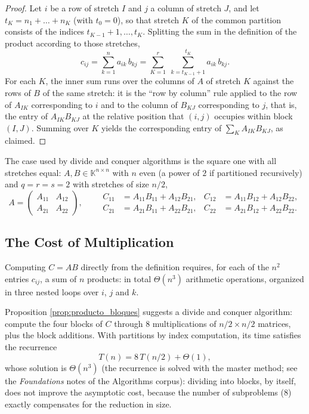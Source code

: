 \documentclass[11pt, a4paper]{article}
\begin{document}
\begin{proof}
Let $i$ be a row of stretch $I$ and $j$ a column of stretch $J$, and let $t_K = n_1 + \dots + n_K$ (with $t_0 = 0$), so that stretch $K$ of the common partition consists of the indices $t_{K-1} + 1, \dots, t_K$. Splitting the sum in the definition of the product according to those stretches,
\[
c_{ij} = \sum_{k=1}^{n} a_{ik} \, b_{kj} = \sum_{K=1}^{r} \; \sum_{k = t_{K-1}+1}^{t_K} a_{ik} \, b_{kj}.
\]
For each $K$, the inner sum runs over the columns of $A$ of stretch $K$ against the rows of $B$ of the same stretch: it is the ``row by column'' rule applied to the row of $A_{IK}$ corresponding to $i$ and to the column of $B_{KJ}$ corresponding to $j$, that is, the entry of $A_{IK} B_{KJ}$ at the relative position that $(i, j)$ occupies within block $(I, J)$. Summing over $K$ yields the corresponding entry of $\sum_{K} A_{IK} B_{KJ}$, as claimed.
\end{proof}

The case used by divide and conquer algorithms is the square one with all stretches equal: $A, B \in \mathbb{K}^{n \times n}$ with $n$ even (a power of $2$ if partitioned recursively) and $q = r = s = 2$ with stretches of size $n/2$,
\[
A = \begin{pmatrix} A_{11} & A_{12} \\ A_{21} & A_{22} \end{pmatrix},
\qquad
\begin{aligned}
C_{11} &= A_{11} B_{11} + A_{12} B_{21}, & C_{12} &= A_{11} B_{12} + A_{12} B_{22}, \\
C_{21} &= A_{21} B_{11} + A_{22} B_{21}, & C_{22} &= A_{21} B_{12} + A_{22} B_{22}.
\end{aligned}
\]

\subsection{The Cost of Multiplication}

Computing $C = AB$ directly from the definition requires, for each of the $n^2$ entries $c_{ij}$, a sum of $n$ products: in total $\Theta(n^3)$ arithmetic operations, organized in three nested loops over $i$, $j$ and $k$.

Proposition \ref{prop:producto_bloques} suggests a divide and conquer algorithm: compute the four blocks of $C$ through $8$ multiplications of $n/2 \times n/2$ matrices, plus the block additions. With partitions by index computation, its time satisfies the recurrence
\[
T(n) = 8 \, T(n/2) + \Theta(1),
\]
whose solution is $\Theta(n^3)$ (the recurrence is solved with the master method; see the \emph{Foundations} notes of the Algorithms corpus): dividing into blocks, by itself, does not improve the asymptotic cost, because the number of subproblems ($8$) exactly compensates for the reduction in size.
\end{document}
